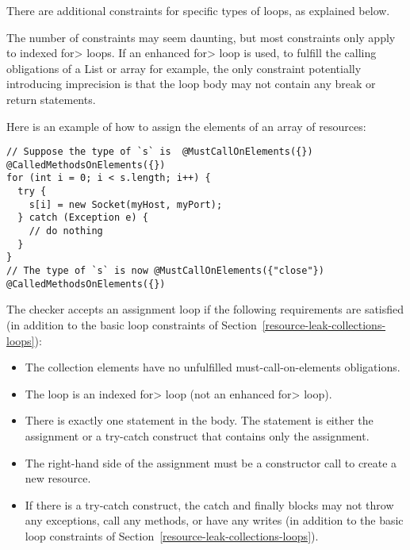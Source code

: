\noindent There are additional constraints for specific types of loops, as
explained below.

The number of constraints may seem daunting, but most constraints only apply to indexed \<for> loops. If an enhanced \<for> loop is used, to fulfill the calling obligations of a List or array for example, the only constraint potentially introducing imprecision is that the loop body may not contain any break or return statements.


Here is an example of how to assign the elements of an array of resources:

\begin{Verbatim}
// Suppose the type of `s` is  @MustCallOnElements({}) @CalledMethodsOnElements({})
for (int i = 0; i < s.length; i++) {
  try {
    s[i] = new Socket(myHost, myPort);
  } catch (Exception e) {
    // do nothing
  }
}
// The type of `s` is now @MustCallOnElements({"close"}) @CalledMethodsOnElements({})
\end{Verbatim}

The checker accepts an assignment loop if the following requirements are
satisfied (in addition to the basic loop constraints of Section~\ref{resource-leak-collections-loops}):

\begin{itemize}
  \item The collection elements have no unfulfilled must-call-on-elements obligations.
  \item The loop is an indexed \<for> loop (not an enhanced \<for> loop).
  \item There is exactly one statement in the body. The statement is either the
    assignment or a try-catch construct that contains only the assignment.
  \item The right-hand side of the assignment must be a constructor call to create a new resource.
  \item If there is a try-catch construct, the catch and finally blocks may
    not throw any exceptions, call any methods, or have any writes (in
    addition to the basic loop constraints of Section~\ref{resource-leak-collections-loops}).
\end{itemize}


